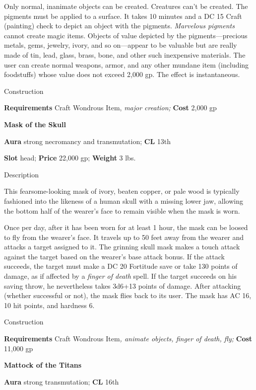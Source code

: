 Only normal, inanimate objects can be created. Creatures can't be created. The pigments must be applied to a surface. It takes 10 minutes and a DC 15 Craft (painting) check to depict an object with the pigments. \textit{Marvelous pigments} cannot create magic items. Objects of value depicted by the pigments---precious metals, gems, jewelry, ivory, and so on---appear to be valuable but are really made of tin, lead, glass, brass, bone, and other such inexpensive materials. The user can create normal weapons, armor, and any other mundane item (including foodstuffs) whose value does not exceed 2,000 gp. The effect is instantaneous. 
				
Construction
				
\textbf{Requirements} Craft Wondrous Item,\textit{ major creation;}\textbf{ Cost }2,000 gp
				
\textbf{Mask of the Skull}
				
\textbf{Aura} strong necromancy and transmutation;\textbf{ CL }13th
				
\textbf{Slot} head; \textbf{Price} 22,000 gp; \textbf{Weight} 3 lbs.
				
Description
				
This fearsome-looking mask of ivory, beaten copper, or pale wood is typically fashioned into the likeness of a human skull with a missing lower jaw, allowing the bottom half of the wearer's face to remain visible when the mask is worn.
				
Once per day, after it has been worn for at least 1 hour, the mask can be loosed to fly from the wearer's face. It travels up to 50 feet away from the wearer and attacks a target assigned to it. The grinning skull mask makes a touch attack against the target based on the wearer's base attack bonus. If the attack succeeds, the target must make a DC 20 Fortitude save or take 130 points of damage, as if affected by a \textit{finger of death} spell. If the target succeeds on his saving throw, he nevertheless takes 3d6+13 points of damage. After attacking (whether successful or not), the mask flies back to its user. The mask has AC 16, 10 hit points, and hardness 6. 
				
Construction
				
\textbf{Requirements} Craft Wondrous Item\textit{, animate objects, finger of death, fly;}\textbf{ Cost }11,000 gp
				
\textbf{Mattock of the Titans}
				
\textbf{Aura} strong transmutation; \textbf{CL} 16th
				
